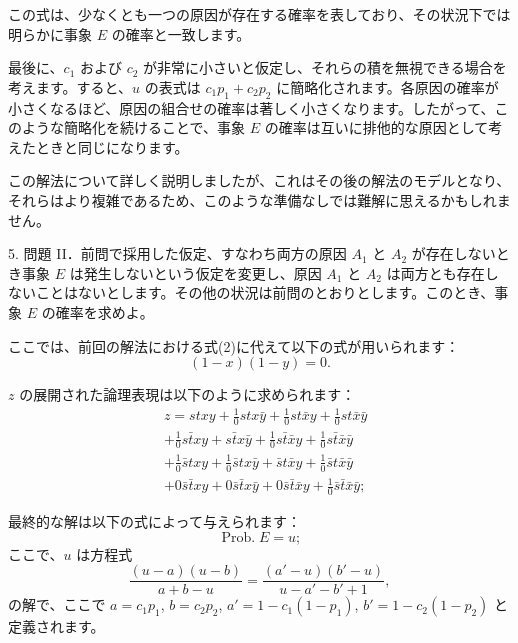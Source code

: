 \documentclass[a4paper,11pt,openany]{ltjsbook}
\begin{document}
この式は、少なくとも一つの原因が存在する確率を表しており、その状況下では明らかに事象 $E$ の確率と一致します。

最後に、$c_1$ および $c_2$ が非常に小さいと仮定し、それらの積を無視できる場合を考えます。すると、$u$ の表式は $c_1 p_1 + c_2 p_2$ に簡略化されます。各原因の確率が小さくなるほど、原因の組合せの確率は著しく小さくなります。したがって、このような簡略化を続けることで、事象 $E$ の確率は互いに排他的な原因として考えたときと同じになります。

この解法について詳しく説明しましたが、これはその後の解法のモデルとなり、それらはより複雑であるため、このような準備なしでは難解に思えるかもしれません。

5. 問題 II．前問で採用した仮定、すなわち両方の原因 $A_1$ と $A_2$ が存在しないとき事象 $E$ は発生しないという仮定を変更し、原因 $A_1$ と $A_2$ は両方とも存在しないことはないとします。その他の状況は前問のとおりとします。このとき、事象 $E$ の確率を求めよ。

ここでは、前回の解法における式(2)に代えて以下の式が用いられます：
\begin{equation*}
(1-x)(1-y) = 0.
\end{equation*}

$z$ の展開された論理表現は以下のように求められます：
\begin{equation*}\begin{split}
& z = stxy + \frac{1}{0} stx\bar{y} + \frac{1}{0}st\bar{x}y + \frac{1}{0} st\bar{x}\bar{y} \\
& + \frac{1}{0}s\bar{t}xy + s\bar{t}x\bar{y} + \frac{1}{0}s\bar{t}\bar{x}y + \frac{1}{0} s\bar{t}\bar{x}\bar{y} \\
& + \frac{1}{0}\bar{s}txy + \frac{1}{0} \bar{s}tx\bar{y} + \bar{s}t\bar{x}y + \frac{1}{0}\bar{s}t\bar{x}\bar{y} \\
& + 0 \bar{s}\bar{t}xy + 0 \bar{s}\bar{t}x\bar{y} + 0\bar{s}\bar{t}\bar{x}y + \frac{1}{0}\bar{s}\bar{t}\bar{x}\bar{y};
\end{split}
\end{equation*}

最終的な解は以下の式によって与えられます：
\begin{equation*}
\operatorname{Prob. } E = u;
\end{equation*}
ここで、$u$ は方程式
\begin{equation*}\tag{1}
\frac{(u-a)(u-b)}{a+b-u}=\frac{(a'-u)(b'-u)}{u-a'-b'+1},
\end{equation*}
の解で、ここで $a=c_1 p_1$, $b=c_2 p_2$, $a'=1 - c_1(1-p_1)$, $b'=1-c_2(1-p_2)$ と定義されます。
\end{document}
